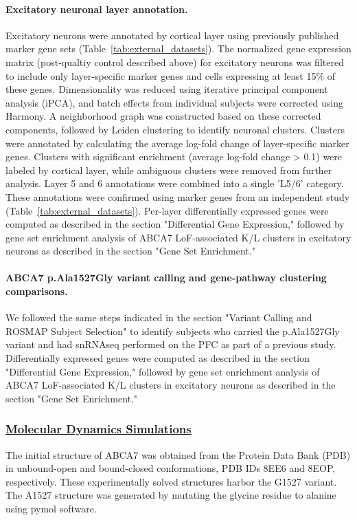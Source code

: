 \documentclass[12pt]{article}
\begin{document}
\paragraph{Excitatory neuronal layer annotation.}
Excitatory neurons were annotated by cortical layer using previously published marker gene sets \cite{He2017-dq} (Table~\ref{tab:external_datasets}). The normalized gene expression matrix (post-qualtiy control described above) for excitatory neurons was filtered to include only layer-specific marker genes and cells expressing at least 15\% of these genes. Dimensionality was reduced using iterative principal component analysis (iPCA), and batch effects from individual subjects were corrected using Harmony. A neighborhood graph was constructed based on these corrected components, followed by Leiden clustering to identify neuronal clusters. Clusters were annotated by calculating the average log-fold change of layer-specific marker genes. Clusters with significant enrichment (average log-fold change > 0.1) were labeled by cortical layer, while ambiguous clusters were  removed from further analysis. Layer 5 and 6 annotations were combined into a single 'L5/6' category. These annotations were confirmed using marker genes from an independent study \cite{Maynard2021-mz} (Table~\ref{tab:external_datasets}). Per-layer differentially expressed genes were computed as described in the section "Differential Gene Expression," followed by gene set enrichment analysis of ABCA7 LoF-associated K/L clusters in excitatory neurons as described in the section "Gene Set Enrichment."

\paragraph{ABCA7 p.Ala1527Gly variant calling and gene-pathway clustering comparisons.}
We followed the same steps indicated in the section "Variant Calling and ROSMAP Subject Selection" to identify subjects who carried the p.Ala1527Gly variant and had snRNAseq performed on the PFC as part of a previous study. Differentially expressed genes were computed as described in the section "Differential Gene Expression," followed by gene set enrichment analysis of ABCA7 LoF-associated K/L clusters in excitatory neurons as described in the section "Gene Set Enrichment."

 \subsubsection{\underline{Molecular Dynamics Simulations}}
The initial structure of ABCA7 was obtained from the Protein Data Bank (PDB) in unbound-open and bound-closed conformations, PDB IDs 8EE6 and 8EOP, respectively. These experimentally solved structures harbor the G1527 variant. The A1527 structure was generated by mutating the glycine residue to alanine using pymol software. 
 
\end{document}

